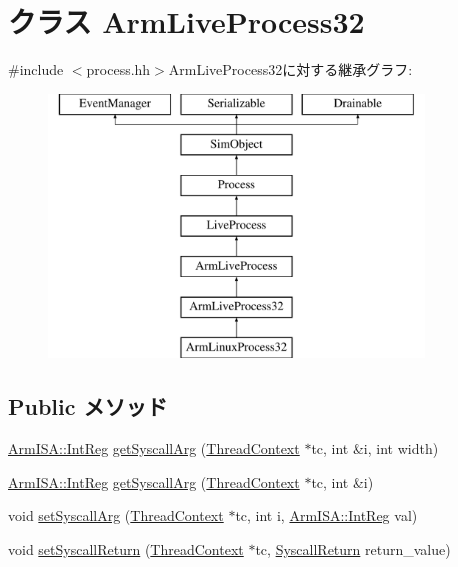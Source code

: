 \hypertarget{classArmLiveProcess32}{
\section{クラス ArmLiveProcess32}
\label{classArmLiveProcess32}
}


{\ttfamily \#include $<$process.hh$>$}ArmLiveProcess32に対する継承グラフ:\begin{figure}[H]
\begin{center}
\leavevmode
\includegraphics[height=7cm]{classArmLiveProcess32}
\end{center}
\end{figure}
\subsection*{Public メソッド}
\begin{DoxyCompactItemize}
\item 
\hyperlink{namespaceArmISA_a0e080577527fb3e9685399f75b5caf15}{ArmISA::IntReg} \hyperlink{classArmLiveProcess32_a52c7542cca5e7218361e5d1baf236cb2}{getSyscallArg} (\hyperlink{classThreadContext}{ThreadContext} $\ast$tc, int \&i, int width)
\item 
\hyperlink{namespaceArmISA_a0e080577527fb3e9685399f75b5caf15}{ArmISA::IntReg} \hyperlink{classArmLiveProcess32_acd6c1a25855e6ca42789dd97c86a17ac}{getSyscallArg} (\hyperlink{classThreadContext}{ThreadContext} $\ast$tc, int \&i)
\item 
void \hyperlink{classArmLiveProcess32_addce5483f248b617812cb55b7e58ffd0}{setSyscallArg} (\hyperlink{classThreadContext}{ThreadContext} $\ast$tc, int i, \hyperlink{namespaceArmISA_a0e080577527fb3e9685399f75b5caf15}{ArmISA::IntReg} val)
\item 
void \hyperlink{classArmLiveProcess32_aaefd02663c1eae206b851290d9276a5e}{setSyscallReturn} (\hyperlink{classThreadContext}{ThreadContext} $\ast$tc, \hyperlink{classSyscallReturn}{SyscallReturn} return\_\-value)
\end{DoxyCompactItemize}
